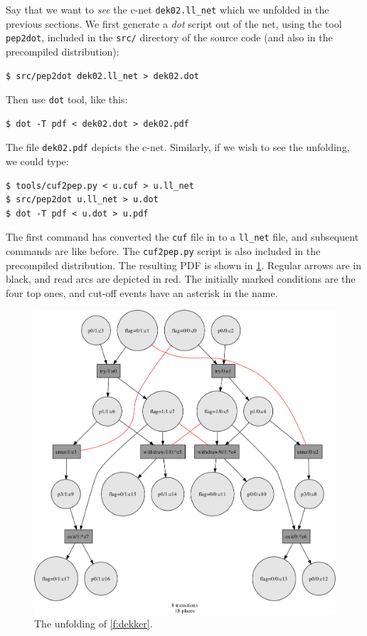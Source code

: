 \documentclass[a4paper]{refart}
\begin{document}
Say that we want to \textit{see} the c-net \verb!dek02.ll_net! which we
unfolded in the previous sections.
We first generate a \textit{dot} script out of the net, using the tool
\verb!pep2dot!, included in the \verb!src/! directory of the source code
(and also in the precompiled distribution):
\begin{verbatim}
$ src/pep2dot dek02.ll_net > dek02.dot
\end{verbatim}
Then use \verb!dot! tool, like this:
\begin{verbatim}
$ dot -T pdf < dek02.dot > dek02.pdf
\end{verbatim}
The file \verb!dek02.pdf! depicts the c-net.
Similarly, if we wish to see the unfolding, we could type:
\begin{verbatim}
$ tools/cuf2pep.py < u.cuf > u.ll_net
$ src/pep2dot u.ll_net > u.dot
$ dot -T pdf < u.dot > u.pdf
\end{verbatim}
The first command has converted the \verb!cuf! file in to a
\verb!ll_net! file, and subsequent commands are like before.
The \verb!cuf2pep.py! script is also included in the precompiled
distribution.
The resulting PDF is shown in \cref{f:dek02unf}.
Regular arrows are in black, and read arcs are depicted in red.
The initially marked conditions are the four top ones,
and cut-off events have an asterisk in the name.

\begin{figure}[bt]
\centering
\includegraphics[scale=0.25]{fig/dek02-unf.pdf}
\caption{The unfolding of \cref{f:dekker}.}
\label{f:dek02unf}
\end{figure}
\end{document}
